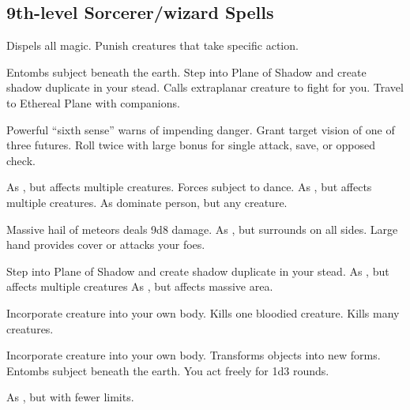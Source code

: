 \subsection{9th-level Sorcerer/wizard Spells} 
\begin{swspelllist}
    \spellhead[Abjur]{}
   Dispels all magic.
   Punish creatures that take specific action.

   Entombs subject beneath the earth.
   Step into Plane of Shadow and create shadow duplicate in your stead.
   Calls extraplanar creature to fight for you.
   Travel to Ethereal Plane with companions.

   Powerful ``sixth sense'' warns of impending danger.
   Grant target vision of one of three futures.
   Roll twice with large bonus for single attack, save, or opposed check.

   As , but affects multiple creatures.
   Forces subject to dance.
   As , but affects multiple creatures.
   As dominate person, but any creature.

   Massive hail of meteors deals 9d8 damage.
   As , but surrounds on all sides.
   Large hand provides cover or attacks your foes.

   Step into Plane of Shadow and create shadow duplicate in your stead.
   As , but affects multiple creatures
   As , but affects massive area.

   Incorporate creature into your own body.
   Kills one bloodied creature.
   Kills many creatures.

   Incorporate creature into your own body.
   Transforms objects into new forms.
   Entombs subject beneath the earth.
   You act freely for 1d3 rounds.

  \M As , but with fewer limits.
\end{swspelllist}

